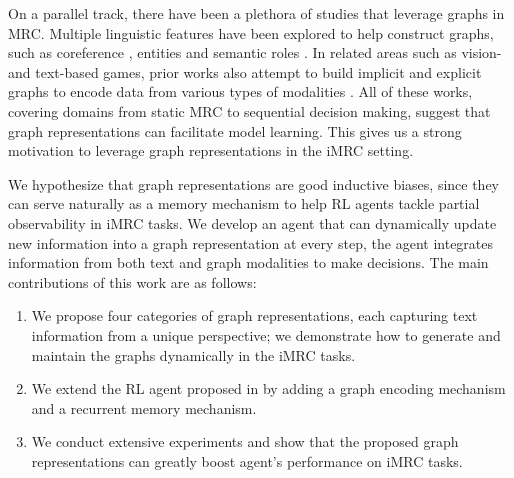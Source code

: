 \documentclass[11pt]{article}
\newcommand{\imrc}{iMRC\xspace}
\begin{document}
On a parallel track, there have been a plethora of studies that leverage graphs in MRC.
Multiple linguistic features have been explored to help construct graphs, such as coreference \citep{dhingra2018neural,song2018exploring}, entities \citep{de2018question,qiu2019dynamically,tu2020select} and semantic roles \citep{zheng2020srlgrn}. 
In related areas such as vision- and text-based games, prior works also attempt to build implicit and explicit graphs to encode data from various types of modalities \citep{johnson2016learning,ammanabrolu19graph,Kipf2020Contrastive,adhikari2020gata}.
All of these works, covering domains from static MRC to sequential decision making, suggest that graph representations can facilitate model learning. 
This gives us a strong motivation to leverage graph representations in the \imrc setting.


We hypothesize that graph representations are good inductive biases, since they can serve naturally as a memory mechanism to help RL agents tackle partial observability in \imrc tasks.
We develop an agent that can dynamically update new information into a graph representation at every step, the agent integrates information from both text and graph modalities to make decisions.
The main contributions of this work are as follows:
\begin{enumerate}
    \item We propose four categories of graph representations, each capturing text information from a unique perspective; we demonstrate how to generate and maintain the graphs dynamically in the \imrc tasks.
    \item We extend the RL agent proposed in \citep{yuan2020imrc} by adding a graph encoding mechanism and a recurrent memory mechanism.
    \item We conduct extensive experiments and show that the proposed graph representations can greatly boost agent's performance on \imrc tasks.
\end{enumerate}
\end{document}
